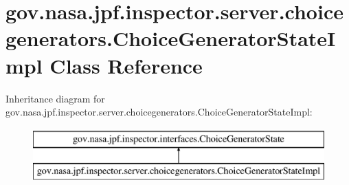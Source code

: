\hypertarget{classgov_1_1nasa_1_1jpf_1_1inspector_1_1server_1_1choicegenerators_1_1_choice_generator_state_impl}{}\section{gov.\+nasa.\+jpf.\+inspector.\+server.\+choicegenerators.\+Choice\+Generator\+State\+Impl Class Reference}
\label{classgov_1_1nasa_1_1jpf_1_1inspector_1_1server_1_1choicegenerators_1_1_choice_generator_state_impl}
Inheritance diagram for gov.\+nasa.\+jpf.\+inspector.\+server.\+choicegenerators.\+Choice\+Generator\+State\+Impl\+:\begin{figure}[H]
\begin{center}
\leavevmode
\includegraphics[height=2.000000cm]{classgov_1_1nasa_1_1jpf_1_1inspector_1_1server_1_1choicegenerators_1_1_choice_generator_state_impl}
\end{center}
\end{figure}
